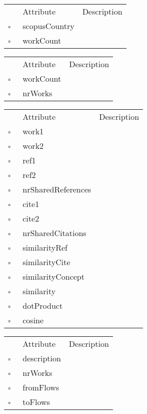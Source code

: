 \begin{table}
\caption{ScopusCity  }

\begin{longtable}{llp{8cm}}
& Attribute & Description \\
$\square$\ & scopusCountry &  \\
$\square$\ & workCount &  \\
\end{longtable}
\label{attr:ScopusCity}
\end{table}

\begin{table}
\caption{ScopusCountry  }

\begin{longtable}{llp{8cm}}
& Attribute & Description \\
$\square$\ & workCount &  \\
$\square$\ & nrWorks &  \\
\end{longtable}
\label{attr:ScopusCountry}
\end{table}

\begin{table}
\caption{Similarity  }

\begin{longtable}{llp{8cm}}
& Attribute & Description \\
$\square$\ & work1 &  \\
$\square$\ & work2 &  \\
$\square$\ & ref1 &  \\
$\square$\ & ref2 &  \\
$\square$\ & nrSharedReferences &  \\
$\square$\ & cite1 &  \\
$\square$\ & cite2 &  \\
$\square$\ & nrSharedCitations &  \\
$\square$\ & similarityRef &  \\
$\square$\ & similarityCite &  \\
$\square$\ & similarityConcept &  \\
$\square$\ & similarity &  \\
$\square$\ & dotProduct &  \\
$\square$\ & cosine &  \\
\end{longtable}
\label{attr:Similarity}
\end{table}

\begin{table}
\caption{SourceGroup  }

\begin{longtable}{llp{8cm}}
& Attribute & Description \\
$\square$\ & description &  \\
$\square$\ & nrWorks &  \\
$\square$\ & fromFlows &  \\
$\square$\ & toFlows &  \\
\end{longtable}
\label{attr:SourceGroup}
\end{table}

